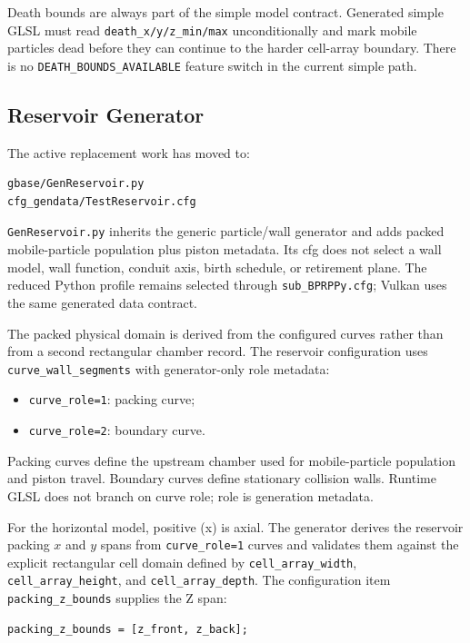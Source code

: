 Death bounds are always part of the simple model contract.  Generated simple
GLSL must read \texttt{death\_x/y/z\_min/max} unconditionally and mark mobile
particles dead before they can continue to the harder cell-array boundary.
There is no \texttt{DEATH\_BOUNDS\_AVAILABLE} feature switch in the current
simple path.

\subsection{Reservoir Generator}

The active replacement work has moved to:
\begin{verbatim}
gbase/GenReservoir.py
cfg_gendata/TestReservoir.cfg
\end{verbatim}

\texttt{GenReservoir.py} inherits the generic particle/wall generator and
adds packed mobile-particle population plus piston metadata.  Its cfg does not
select a wall model, wall function, conduit axis, birth schedule, or
retirement plane.  The reduced Python profile remains selected through
\texttt{sub\_BPRPPy.cfg}; Vulkan uses the same generated data contract.

The packed physical domain is derived from the configured curves rather than
from a second rectangular chamber record.  The reservoir configuration uses
\texttt{curve\_wall\_segments} with generator-only role metadata:
\begin{itemize}
    \item \texttt{curve\_role=1}: packing curve;
    \item \texttt{curve\_role=2}: boundary curve.
\end{itemize}
Packing curves define the upstream chamber used for mobile-particle
population and piston travel.  Boundary curves define stationary collision
walls.  Runtime GLSL does not branch on curve role; role is generation
metadata.

For the horizontal model, positive (x) is axial.  The generator derives the
reservoir packing \(x\) and \(y\) spans from \texttt{curve\_role=1} curves and
validates them against the explicit rectangular cell domain defined by
\texttt{cell\_array\_width}, \texttt{cell\_array\_height}, and
\texttt{cell\_array\_depth}.  The configuration item
\texttt{packing\_z\_bounds} supplies the Z span:
\begin{verbatim}
packing_z_bounds = [z_front, z_back];
\end{verbatim}

